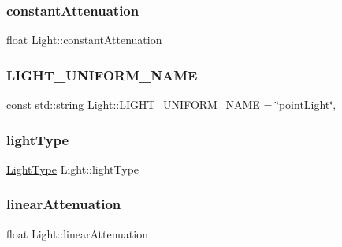 \subsubsection{\texorpdfstring{constant\+Attenuation}{constantAttenuation}}
{\footnotesize\ttfamily float Light\+::constant\+Attenuation\hspace{0.3cm}{\ttfamily [private]}}

\hypertarget{class_light_ab2d40f6c364cf728d03a90ff885e37cb}{}\label{class_light_ab2d40f6c364cf728d03a90ff885e37cb} 
\subsubsection{\texorpdfstring{L\+I\+G\+H\+T\+\_\+\+U\+N\+I\+F\+O\+R\+M\+\_\+\+N\+A\+ME}{LIGHT\_UNIFORM\_NAME}}
{\footnotesize\ttfamily const std\+::string Light\+::\+L\+I\+G\+H\+T\+\_\+\+U\+N\+I\+F\+O\+R\+M\+\_\+\+N\+A\+ME = \char`\"{}point\+Light\char`\"{}\hspace{0.3cm}{\ttfamily [static]}, {\ttfamily [private]}}

\hypertarget{class_light_ab0c279c927973443f7b52fc924b489aa}{}\label{class_light_ab0c279c927973443f7b52fc924b489aa} 
\subsubsection{\texorpdfstring{light\+Type}{lightType}}
{\footnotesize\ttfamily \hyperlink{class_light_a661d9480e01af8b1612860b9630ef5f8}{Light\+Type} Light\+::light\+Type\hspace{0.3cm}{\ttfamily [private]}}

\hypertarget{class_light_afcb2da592197efae015ae16c1c5bfceb}{}\label{class_light_afcb2da592197efae015ae16c1c5bfceb} 
\subsubsection{\texorpdfstring{linear\+Attenuation}{linearAttenuation}}
{\footnotesize\ttfamily float Light\+::linear\+Attenuation\hspace{0.3cm}{\ttfamily [private]}}

